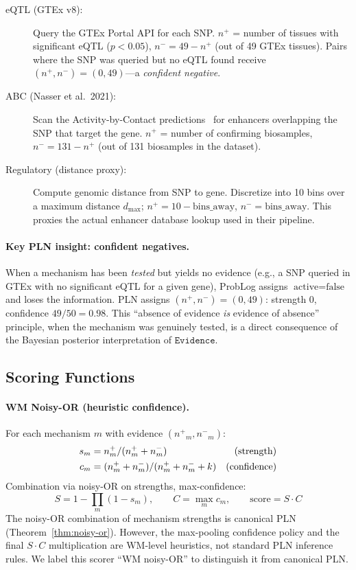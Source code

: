 \documentclass[]{article}
\newcommand{\ty}[1]{\ensuremath{\mathtt{#1}}}
\newcommand{\Evidence}{\ty{Evidence}}
\newcommand{\nplus}{\ensuremath{n^{+}}}
\newcommand{\nminus}{\ensuremath{n^{-}}}
\begin{document}
\begin{description}
\item[eQTL (GTEx v8):] Query the GTEx Portal API for each SNP.
  $\nplus$ = number of tissues with significant eQTL ($p < 0.05$),
  $\nminus = 49 - \nplus$ (out of 49 GTEx tissues).
  Pairs where the SNP was queried but no eQTL found receive
  $(\nplus, \nminus) = (0, 49)$---a \emph{confident negative}.

\item[ABC (Nasser et al.\ 2021):] Scan the Activity-by-Contact
  predictions~\cite{Nasser2021ABC} for enhancers overlapping the SNP
  that target the gene.  $\nplus$ = number of confirming biosamples,
  $\nminus = 131 - \nplus$ (out of 131 biosamples in the dataset).

\item[Regulatory (distance proxy):] Compute genomic distance from SNP
  to gene.  Discretize into 10 bins over a maximum distance $d_{\max}$;
  $\nplus = 10 - \text{bins\_away}$, $\nminus = \text{bins\_away}$.
  This proxies the actual enhancer database lookup used in their pipeline.
\end{description}

\paragraph{Key PLN insight: confident negatives.}
When a mechanism has been \emph{tested} but yields no evidence (e.g., a SNP
queried in GTEx with no significant eQTL for a given gene), ProbLog assigns
$\text{active} = \text{false}$ and loses the information.  PLN assigns
$(\nplus, \nminus) = (0, 49)$: strength $0$, confidence $49/50 = 0.98$.
This ``absence of evidence \emph{is} evidence of absence'' principle, when
the mechanism was genuinely tested, is a direct consequence of the Bayesian
posterior interpretation of \Evidence{}.

\subsection{Scoring Functions}

\paragraph{WM Noisy-OR (heuristic confidence).}
For each mechanism $m$ with evidence $(\nplus_m, \nminus_m)$:
\begin{align}
  s_m &= \nplus_m / (\nplus_m + \nminus_m) & \text{(strength)} \notag \\
  c_m &= (\nplus_m + \nminus_m) / (\nplus_m + \nminus_m + k) & \text{(confidence)} \notag
\end{align}
Combination via noisy-OR on strengths, max-confidence:
\begin{equation}
  S = 1 - \prod_m (1 - s_m), \qquad C = \max_m c_m, \qquad \text{score} = S \cdot C
  \label{eq:wm-noisy-or}
\end{equation}
The noisy-OR combination of mechanism strengths is canonical PLN
(Theorem~\ref{thm:noisy-or}).  However, the max-pooling confidence policy
and the final $S \cdot C$ multiplication are WM-level heuristics, not
standard PLN inference rules.  We label this scorer ``WM noisy-OR'' to
distinguish it from canonical PLN.
\end{document}
